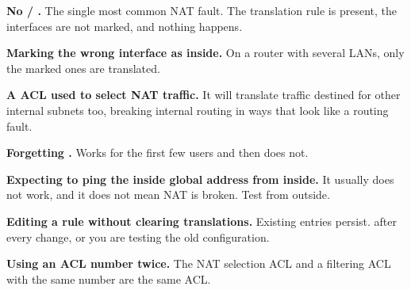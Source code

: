 \begin{pitfall}
\begin{tight}
  \item \textbf{No  / .} The single most
        common NAT fault. The translation rule is present, the interfaces are not
        marked, and nothing happens.
  \item \textbf{Marking the wrong interface as inside.} On a router with several
        LANs, only the marked ones are translated.
  \item \textbf{A  ACL used to select NAT traffic.} It
        will translate traffic destined for other internal subnets too, breaking
        internal routing in ways that look like a routing fault.
  \item \textbf{Forgetting .} Works for the first few users and
        then does not.
  \item \textbf{Expecting to ping the inside global address from inside.} It
        usually does not work, and it does not mean NAT is broken. Test from
        outside.
  \item \textbf{Editing a rule without clearing translations.} Existing entries
        persist.  after every change, or you are
        testing the old configuration.
  \item \textbf{Using an ACL number twice.} The NAT selection ACL and a filtering
        ACL with the same number are the same ACL.
\end{tight}
\end{pitfall}


